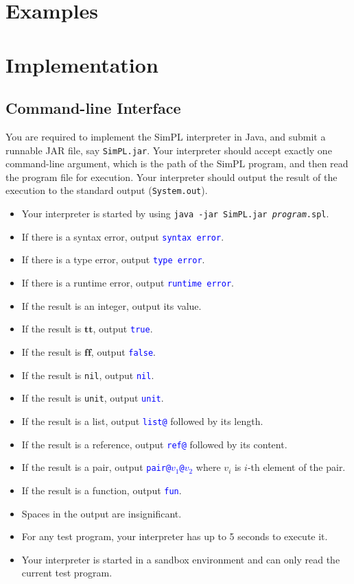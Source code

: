 \documentclass{article}
\newcommand{\btt}{\mathbf{tt}}
\newcommand{\bff}{\mathbf{ff}}
\newcommand{\result}[1]{\textcolor{blue}{\texttt{#1}}}
\begin{document}
\section{Examples}








\section{Implementation}

\subsection{Command-line Interface}

You are required to implement the SimPL interpreter in Java, and submit a runnable JAR file, say \texttt{SimPL.jar}.  Your interpreter should accept exactly one command-line argument, which is the path of the SimPL program, and then read the program file for execution.  Your interpreter should output the result of the execution to the standard output (\texttt{System.out}).
\begin{itemize}
  \item Your interpreter is started by using \texttt{java -jar SimPL.jar \emph{program}.spl}.
  \item If there is a syntax error, output \result{syntax error}.
  \item If there is a type error, output \result{type error}.
  \item If there is a runtime error, output \result{runtime error}.
  \item If the result is an integer, output its value.
  \item If the result is $\btt$, output \result{true}.
  \item If the result is $\bff$, output \result{false}.
  \item If the result is \texttt{nil}, output \result{nil}.
  \item If the result is \texttt{unit}, output \result{unit}.
  \item If the result is a list, output \result{list@} followed by its length.
  \item If the result is a reference, output \result{ref@} followed by its content.
  \item If the result is a pair, output \result{pair@$v_1$@$v_2$} where $v_i$ is $i$-th element of the pair.
  \item If the result is a function, output \result{fun}.
  \item Spaces in the output are insignificant.
  \item For any test program, your interpreter has up to 5 seconds to execute it.
  \item Your interpreter is started in a sandbox environment and can only read the current test program.
\end{itemize}
\end{document}

